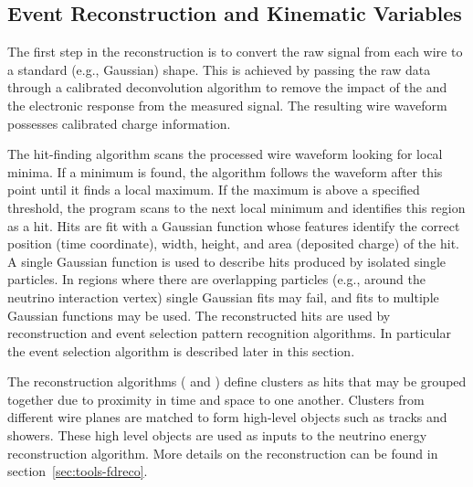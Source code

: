 \subsection{Event Reconstruction and Kinematic Variables}
The first step in the reconstruction is to convert the raw signal from each wire to a standard (e.g., Gaussian) shape. This is achieved by passing the raw data through a calibrated deconvolution algorithm to remove the impact of the  \efield and the electronic response from the measured signal. The resulting wire waveform possesses calibrated charge information. 

The hit-finding algorithm scans the processed wire waveform looking for local minima. If a minimum is found, the algorithm follows the waveform after this point until it finds a local maximum. If the maximum is above a specified threshold, the program scans to the next local minimum and identifies this region as a hit. Hits are fit with a Gaussian function whose features identify the correct position (time coordinate), width, height, and area (deposited charge) of the hit. A single Gaussian function is used to describe hits produced by isolated single particles. In regions where there are overlapping particles (e.g., around the neutrino interaction vertex) single Gaussian fits may fail, and fits to multiple Gaussian functions may be used. The reconstructed hits are used by reconstruction and event selection pattern recognition algorithms. In particular the  event selection algorithm is described later in this section.

The reconstruction algorithms ( and ) define clusters as hits that may be grouped together due to proximity in time and space to one another. Clusters from different wire planes are matched to form high-level objects such as tracks and showers. These high level objects are used as inputs to the neutrino energy reconstruction algorithm. More details on the reconstruction can be found in section~\ref{sec:tools-fdreco}.


